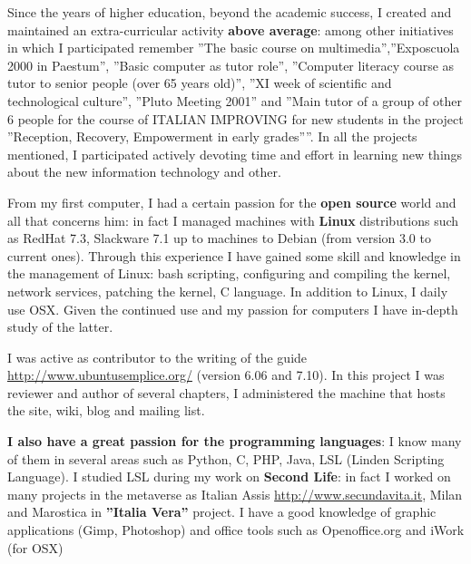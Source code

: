 \documentclass[totpages,helvetica,openbib,english]{europecv}
\begin{document}
\begin{europecv}
{Since the years of higher education, beyond the academic success, I created and maintained an extra-curricular activity \textbf{above average}: among other initiatives in which I participated remember ''The basic course on multimedia'',''Exposcuola 2000 in Paestum'', ''Basic computer as tutor role'', ''Computer literacy course as tutor to senior people (over 65 years old)'', ''XI week of scientific and technological culture'', ''Pluto Meeting 2001'' and ''Main tutor of a group of other 6 people for the course of ITALIAN IMPROVING for new students in the project ''Reception, Recovery, Empowerment in early grades''''. In all the projects mentioned, I participated actively devoting time and effort in learning new things about the new information technology and other.

From my first computer, I had a certain passion for the \textbf{open source} world and all that concerns him: in fact I managed machines with \textbf{Linux} distributions such as RedHat 7.3, Slackware 7.1 up to machines to Debian (from version 3.0 to current ones). Through this experience I have gained some skill and knowledge in the management of Linux: bash scripting, configuring and compiling the kernel, network services, patching the kernel, C language. In addition to Linux, I daily use OSX. Given the continued use and my passion for computers I have in-depth study of the latter.

I was active as contributor to the writing of the guide \url{http://www.ubuntusemplice.org/} (version 6.06 and 7.10). In this project I was reviewer and author of several chapters, I administered the machine that hosts the site, wiki, blog and mailing list.

\textbf{I also have a great passion for the programming languages}: I know many of them in several areas such as Python, C, PHP, Java, LSL (Linden Scripting Language). I studied LSL during my work on \textbf{Second Life}: in fact I worked on many projects in the metaverse as Italian Assis \url{http://www.secundavita.it}, Milan and Marostica in \textbf{''Italia Vera''} project.
I have a good knowledge of graphic applications (Gimp, Photoshop) and office tools such as Openoffice.org and iWork (for OSX)}


\end{europecv}
\end{document}
